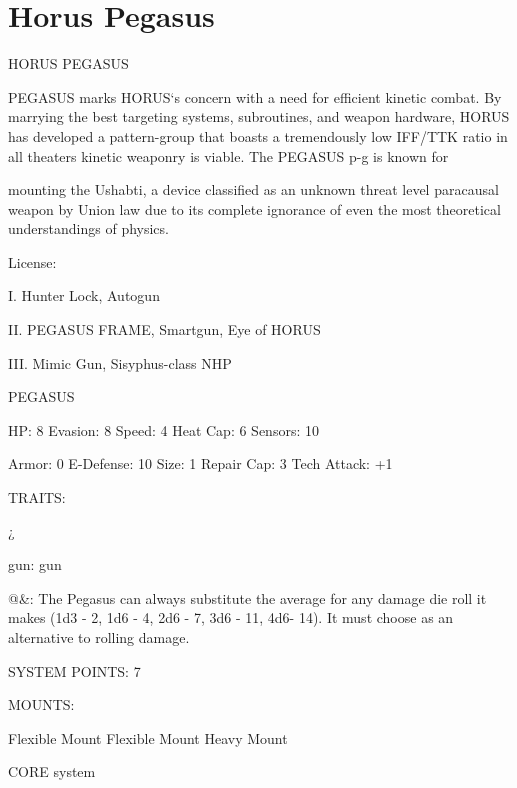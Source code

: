 \section{Horus Pegasus}

                                         HORUS PEGASUS

PEGASUS marks HORUS‘s concern with a need for efficient kinetic combat. By marrying the best targeting
systems, subroutines, and weapon hardware, HORUS has developed a pattern-group that boasts a
tremendously low IFF/TTK ratio in all theaters kinetic weaponry is viable. The PEGASUS p-g is known for

mounting the Ushabti, a device classified as an unknown threat level paracausal weapon by Union law due
to its complete ignorance of even the most theoretical understandings of physics.

                                                  License:

I. Hunter Lock, Autogun

II. PEGASUS FRAME, Smartgun, Eye of HORUS

III. Mimic Gun, Sisyphus-class NHP





                                                    PEGASUS

  HP: 8           Evasion: 8                              Speed: 4            Heat Cap: 6         Sensors: 10

  Armor: 0        E-Defense: 10                           Size: 1             Repair Cap: 3       Tech Attack:
                                                                                                  +1

                                                      TRAITS:

  ¿%

  gun: gun

  @\&: The Pegasus can always substitute the average for any damage die roll it makes  (1d3 - 2, 1d6 - 4,
  2d6 - 7, 3d6 - 11, 4d6- 14). It must choose as an alternative to rolling damage.

                                                SYSTEM POINTS: 7

                                                     MOUNTS:

  Flexible Mount                      Flexible Mount                          Heavy Mount

                                                   CORE system

